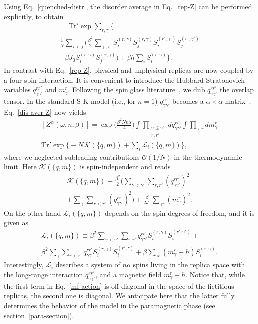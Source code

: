 \documentclass[twocolumn,superscriptaddress,prb,10pt]{revtex4-1}
\def\tr{\textrm{Tr}}
\begin{document}
Using Eq.~\eqref{quenched-distr}, the disorder average in Eq.~\eqref{rep-Z} 
can be performed explicitly, to obtain 
%
\begin{multline}
[Z^\alpha(\omega,n,\beta)]=\tr'\exp\sum\limits_{r,\gamma}\Big\{\\
\frac{1}{N}
\sum\limits_{i<j}\Big(
\frac{\beta^2}{2}\sum\limits_{\gamma',r'}S^{(r,\gamma)}_iS^{(r,\gamma)}_j
S^{(r',\gamma')}_iS^{(r',\gamma')}_j\\
+\beta J_0 S_i^{(r,\gamma)}S_j^{(r,\gamma)}\Big)
+\beta h\sum\limits_{i}
S_i^{(r,\gamma)}\Big\}.
\label{dis-aver-Z}
\end{multline}
%
In contrast with Eq.~\eqref{rep-Z}, physical and unphysical replicas are 
now coupled by a four-spin interaction. It is convenient to introduce the  
Hubbard-Stratonovich variables $q_{\gamma\gamma'}^{rr'}$ and $m_\gamma^r$. 
Following the spin glass literature~\cite{parisi-book}, we dub $q_{\gamma
\gamma'}^{rr'}$ the overlap tensor. In the standard S-K model (i.e., for $n=1$) 
$q_{\gamma\gamma'}^{rr'}$ becomes a $\alpha\times\alpha$ 
matrix~\cite{sherrington-1978-prl}. Eq.~\eqref{dis-aver-Z} now 
yields  
%
\begin{multline}
\label{hs-Z}
[Z^\alpha(\omega,n,\beta)]=\exp\Big(\frac{\beta^2Nn\alpha}{4}\Big)
\int\prod_{\substack{\gamma\le\gamma'\\r,r'}}
dq^{rr'}_{\gamma\gamma'}
\int\prod_{\gamma,r}dm_\gamma^r\\
\tr'\exp
\Big\{-N {\mathcal K}(\{q,m\})
+\sum_i{\mathcal L}_i(\{q,m\})\Big\},
\end{multline}
%
where we neglected subleading contributions ${\mathcal O}(1/N)$ in 
the thermodynamic limit. Here ${\mathcal K}(\{q,m\})$ is spin-independent 
and reads 
%
\begin{multline}
{\mathcal K}(\{q,m\})\equiv 
\frac{\beta^2}{2}\Big(\sum\limits_{\gamma<\gamma'}\sum
\limits_{r,r'} (q_{\gamma\gamma'}^{rr'})^2
\\
+\sum\limits_{\gamma}\sum\limits_{r<r'}(q_{\gamma\gamma}^{
rr'})^2\Big)
+\frac{\beta}{2 J_0}\sum\limits_{\gamma r}(m_\gamma^r)^2. 
\label{Gamma}
\end{multline}
%
On the other hand ${\mathcal L}_i(\{q,m\})$ depends on the spin degrees of 
freedom, and it is given as   
%
\begin{multline}
{\mathcal L}_i(\{q,m\})
\equiv\beta^2\sum\limits_{\gamma<\gamma'}\sum\limits_{r,r'}
q_{\gamma\gamma'}^{rr'}S_i^{(r,\gamma)}
S_i^{(r',\gamma')}+\\
\beta^2\sum_\gamma\sum\limits_{r<r'}
q_{\gamma\gamma}^{rr'}S^{(r,\gamma)}_i
S^{(r',\gamma)}_i
+\beta\sum\limits_{\gamma r}(m_\gamma^r+h)
S_i^{(r,\gamma)}.
\label{mf-action}
\end{multline}
%
Interestingly, ${\mathcal L}_i$ describes a system of $n\alpha$ spins living 
in the replica space with the long-range interaction $q_{\gamma\gamma'}^{rr'}$, 
and a magnetic field $m_\gamma^r+h$. Notice that, while the first term in 
Eq.~\eqref{mf-action} is off-diagonal in the space of the fictitious replicas, 
the second one is diagonal. We anticipate here that the latter fully determines the 
behavior of the model in the paramagnetic phase (see section~\ref{para-section}). 
\end{document}
